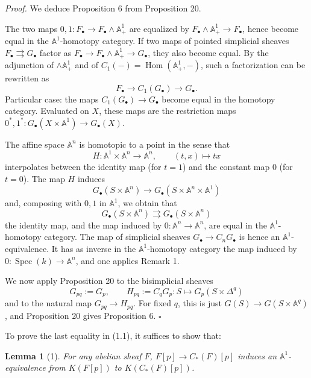 \documentclass[11pt]{article}
\newcommand{\Aone}{\mathbb A^1}
\newcommand{\A}{\mathbb A}
\newcommand{\Spec}{\operatorname{Spec}}
\newcommand{\Hom}{\operatorname{Hom}}
\theoremstyle{deligne}
\newtheorem*{lemma*}{Lemma}
\newenvironment{proofdel}{\noindent\textit{Proof.}}{\hfill$\square$}
\begin{document}
\begin{proofdel}
We deduce Proposition 6 from Proposition 20.

The two maps \(0,1:F_\bullet\to F_\bullet\wedge\Aone_+\) are equalized by \(F_\bullet\wedge\Aone_+\to F_\bullet\), hence become equal in the \(\Aone\)-homotopy category. If two maps of pointed simplicial sheaves \(F_\bullet\rightrightarrows G_\bullet\) factor as \(F_\bullet\to F_\bullet\wedge\Aone_+\to G_\bullet\), they also become equal. By the adjunction of \(\wedge\Aone_+\) and of \(C_1(-)=\Hom(\Aone_+,-)\), such a factorization can be rewritten as
\[
F_\bullet\longrightarrow C_1(G_\bullet)\longrightarrow G_\bullet.
\]
Particular case: the maps \(C_1(G_\bullet)\to G_\bullet\) become equal in the homotopy category. Evaluated on \(X\), these maps are the restriction maps \(0^*,1^*:G_\bullet(X\times\Aone)\to G_\bullet(X)\).

The affine space \(\A^n\) is homotopic to a point in the sense that
\[
H:\Aone\times\A^n\longrightarrow\A^n,\qquad (t,x)\longmapsto tx
\]
interpolates between the identity map (for \(t=1\)) and the constant map \(0\) (for \(t=0\)). The map \(H\) induces
\[
G_\bullet(S\times\A^n)\longrightarrow G_\bullet(S\times\A^n\times\Aone)
\]
and, composing with \(0,1\) in \(\Aone\), we obtain that
\[
G_\bullet(S\times\A^n)\rightrightarrows G_\bullet(S\times\A^n)
\]
the identity map, and the map induced by \(0:\A^n\to\A^n\), are equal in the \(\Aone\)-homotopy category. The map of simplicial sheaves \(G_\bullet\to C_nG_\bullet\) is hence an \(\Aone\)-equivalence. It has as inverse in the \(\Aone\)-homotopy category the map induced by \(0:\Spec(k)\to\A^n\), and one applies Remark 1.

We now apply Proposition 20 to the bisimplicial sheaves
\[
G_{pq}:=G_p,\qquad
H_{pq}:=C_qG_p:S\longmapsto G_p(S\times\Delta^q)
\]
and to the natural map \(G_{pq}\to H_{pq}\). For fixed \(q\), this is just \(G(S)\to G(S\times\A^q)\), and Proposition 20 gives Proposition 6.
\end{proofdel}

To prove the last equality in (1.1), it suffices to show that:

\begin{lemma*}[1]
For any abelian sheaf \(F\), \(F[p]\to C_*(F)[p]\) induces an \(\Aone\)-equivalence from \(K(F[p])\) to \(K(C_*(F)[p])\).
\end{lemma*}
\end{document}
